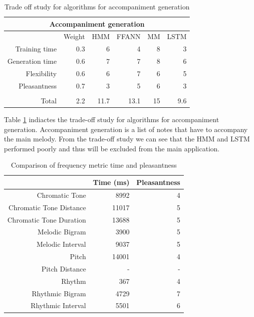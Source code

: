 \begin{table}[htbp]
  \centering
  \caption{Trade off study for algorithms for accompaniment generation}
    \begin{tabular}{rr|rrrr}
    \toprule
    \multicolumn{6}{c}{Accompaniment generation} \\
    \midrule
          & Weight & HMM   & FFANN & MM    & LSTM \\
    \midrule  
    Training time & 0.3   & 6     & 4     & 8     & 3 \\
    Generation time & 0.6   & 7     & 7     & 8     & 6 \\
    Flexibility & 0.6   & 6     & 7     & 6     & 5 \\
    Pleasantness & 0.7   & 3     & 5     & 6     & 3 \\
          &       &       &       &       &  \\
          \bottomrule
    Total & 2.2   & 11.7  & 13.1  & 15    & 9.6 \\
    \bottomrule
    \end{tabular}%
  \label{tab:toaccompgen}%
\end{table}%

Table \ref{tab:toaccompgen} indiactes the trade-off study for algorithms for accompaniment generation. Accompaniment generation is a list of notes that have to accompany the main melody. From the trade-off study we can see that the \ac{HMM} and \ac{LSTM} performed poorly and thus will be excluded from the main application.

\begin{table}[htbp]
  \centering
  \caption{Comparison of frequency metric time and pleasantness}
    \begin{tabular}{r|rr}
    \toprule
          & Time (ms) & Pleasantness \\
    \midrule
    Chromatic Tone & 8992  & 4 \\
    Chromatic Tone Distance & 11017 & 5 \\
    Chromatic Tone Duration & 13688 & 5 \\
    Melodic Bigram & 3900  & 5 \\
    Melodic Interval & 9037  & 5 \\
    Pitch & 14001 & 4 \\
    Pitch Distance & -     & - \\
    Rhythm & 367   & 4 \\
    Rhythmic Bigram & 4729  & 7 \\
    Rhythmic Interval & 5501  & 6 \\
    \bottomrule
    \end{tabular}%
  \label{tab:fmetrictimepleasant}%
\end{table}%


